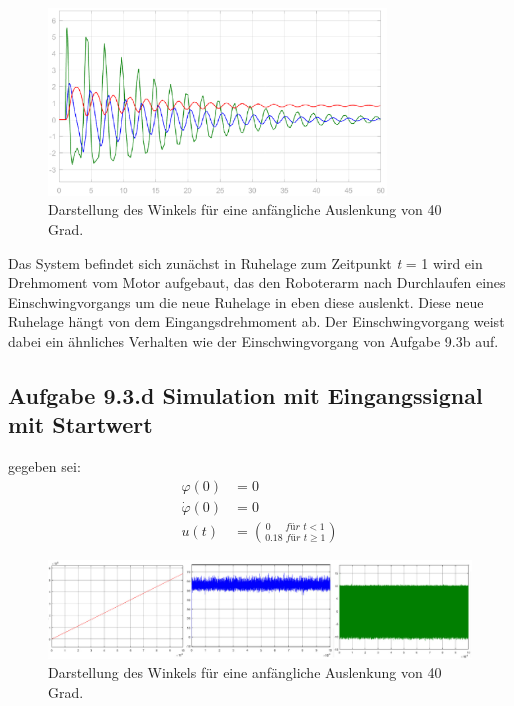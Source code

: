 \documentclass[10pt]{scrartcl}
\begin{document}
\begin{figure}[H]
	\centering
	\includegraphics[width=0.8\textwidth]{9c}
	\caption{Darstellung des Winkels für eine anfängliche Auslenkung von 40 Grad. }
	\label{img:grafik-dummy}
\end{figure}

Das System befindet sich zunächst in Ruhelage zum Zeitpunkt \textit t = 1 wird ein Drehmoment vom Motor aufgebaut,
das den Roboterarm nach Durchlaufen eines Einschwingvorgangs um die neue Ruhelage in eben diese auslenkt.
Diese neue Ruhelage hängt von dem Eingangsdrehmoment ab. Der Einschwingvorgang weist dabei ein ähnliches Verhalten wie der Einschwingvorgang von Aufgabe 9.3b auf.



\subsection{Aufgabe 9.3.d Simulation mit Eingangssignal mit Startwert}
gegeben sei:
\begin{align}
\varphi  (0) &= 0 \\
\dot \varphi (0) &= 0 \\
u(t)  &= \binom{0\,\,\,\,\,\,\,\,\, für\,\, t<1}{0.18\,\, für\,\, t \geq 1}
\end{align}

\begin{figure}[H]
	\centering
	\includegraphics[width=1.2\textwidth]{Theoretischer Teil/Aufgabe9c.png}
	\caption{Darstellung des Winkels für eine anfängliche Auslenkung von 40 Grad. }
	\label{img:grafik-dummy}
\end{figure}
\end{document}
